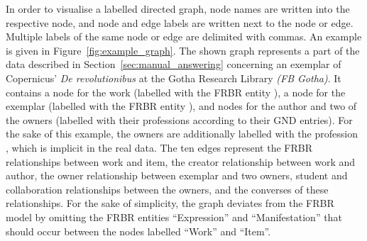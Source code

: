 In order to visualise a labelled directed graph,
node names are written into the respective node,
and node and edge labels are written next to the node or edge.
Multiple labels of the same node or edge are delimited with commas.
An example is given in Figure~\ref{fig:example_graph}.
The shown graph represents a part of the data described in Section~\ref{sec:manual_answering}
concerning an exemplar of Copernicus' \emph{De revolutionibus} at the
Gotha Research Library \emph{(FB Gotha)}.
It contains a node for the work (labelled with the \gls{FRBR} entity ),
a node for the exemplar (labelled with the \gls{FRBR} entity ),
and nodes for the author and two of the owners (labelled with their professions according to their \gls{GND} entries).
For the sake of this example, the owners are additionally labelled with the profession
, which is implicit in the real data.
The ten edges represent the \gls{FRBR} relationships between work and item,
the creator relationship between work and author,
the owner relationship between exemplar and two owners,
student and collaboration relationships between the owners,
and the converses of these relationships.
For the sake of simplicity, the graph deviates from the \gls{FRBR} model \autocite{FRBR1998}
by omitting the \gls{FRBR} entities \enquote{Expression} and \enquote{Manifestation}
that should occur between the nodes labelled \enquote{Work} and \enquote{Item}.

